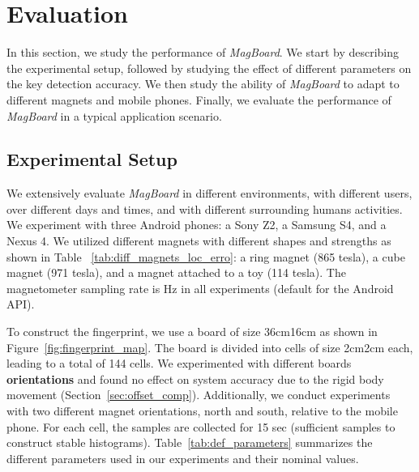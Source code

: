 \documentclass[conference]{IEEEtran}
\def \sys {\textit{MagBoard}}
\begin{document}
\section{Evaluation}
\label{sec:evaluation}

In this section, we study the performance of \sys{}. We start by describing the experimental setup, followed by studying the effect of different parameters on the key detection accuracy. We then study the ability of \sys{} to adapt to different magnets and mobile phones. Finally, we evaluate the performance of \sys{} in a typical application scenario.

\subsection{Experimental Setup}
We extensively evaluate \sys{} in different environments, with different users, over different days and times, and with different surrounding humans activities. We experiment with three Android phones: a Sony Z2, a Samsung S4, and a Nexus 4. We utilized different magnets with different shapes and strengths as shown in Table ~\ref{tab:diff_magnets_loc_erro}: a ring magnet (865 tesla), a cube magnet (971 tesla), and a magnet attached to a toy (114 tesla). The magnetometer sampling rate is  Hz in all experiments (default for the Android API). 

To construct the fingerprint, we use a board of size 36cm16cm as shown in Figure~\ref{fig:fingerprint_map}. The board is divided into cells of size 2cm2cm each, leading to a total of 144 cells. We experimented with different boards \textbf{orientations} and found no effect on system accuracy due to the rigid body movement (Section~\ref{sec:offset_comp}). 
Additionally, we conduct experiments with two different magnet orientations, north and south, relative to the mobile phone. For each cell, the samples are collected for 15 sec (sufficient samples to construct stable histograms). 
Table~\ref{tab:def_parameters} summarizes the different parameters used in our experiments and their nominal values.
\end{document}
